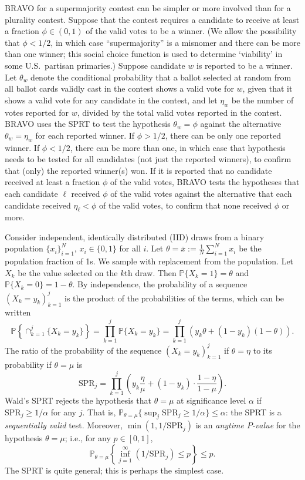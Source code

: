 \documentclass[aoas]{imsart}
\newcommand{\SPR}{\ensuremath{\mathrm{SPR}}}
\renewcommand{\Pr}{\mathbb{P}}
\begin{document}
BRAVO for a supermajority contest can be simpler or more involved than for a plurality contest. 
Suppose that the contest requires a candidate to receive at least a fraction $\phi \in (0, 1)$ of the valid votes
to be a winner.
(We allow the possibility that $\phi < 1/2$, in which case ``supermajority'' is a misnomer and there can be more than one winner;
this social choice function is used to determine `viability' in some U.S.\ partisan primaries.)
Suppose candidate $w$ is reported to be a winner.
Let $\theta_w$ denote the conditional probability that a ballot selected
at random from all ballot cards validly cast in the contest shows a valid vote for $w$, given that it shows a valid 
vote for any candidate in the contest,
and let $\eta_w$ be the number of votes reported for $w$, divided by the total valid votes reported in the contest.
BRAVO uses the SPRT to test the hypothesis $\theta_w = \phi$ against the alternative $\theta_w = \eta_w$
for each reported winner. 
If $\phi > 1/2$, there can be only one reported winner. 
If $\phi < 1/2$, there can be more than one, in which case
that hypothesis needs to be tested for all candidates (not just the reported winners), to confirm that (only) the
reported winner(s) won.
If it is reported that no candidate received at least a fraction $\phi$ of the valid votes,  
BRAVO tests the hypotheses that each candidate $\ell$  received $\phi$ of the valid votes
against the alternative that each candidate received $\eta_\ell < \phi$ of the valid votes,
to confirm that none received $\phi$ or more.

Consider independent, identically distributed (IID) draws from a binary population $\{x_i\}_{i=1}^N$, 
$x_i \in \{0, 1\}$ for all $i$.
Let $\theta = \bar{x} := \frac{1}{N} \sum_{i=1}^N x_i$ be the population fraction of 1s.
We sample with replacement from the population.
Let $X_k$ be the value selected on the $k$th draw. 
Then $\Pr \{X_k = 1 \} = \theta$ and $\Pr \{X_k = 0 \} = 1-\theta$.
By independence, the probability of a sequence $(X_k=y_k)_{k=1}^j$ is the product of the probabilities of the terms,
which can be written 
\begin{equation}
\Pr \left \{ \cap_{k=1}^j \{X_k = y_k \} \right \}= \prod_{k=1}^j \Pr \{X_k = y_k\} = \prod_{k=1}^j \left ( y_k \theta + (1-y_k)(1-\theta) \right ).
\end{equation}
The ratio of the probability of the sequence $(X_k=y_k)_{k=1}^j$ if $\theta = \eta$ to its probability if $\theta = \mu$ is
\begin{equation}
  \SPR_j = \prod_{k=1}^j \left ( y_k \frac{\eta}{\mu} + (1-y_k) \cdot \frac{1-\eta}{1-\mu} \right ).
\end{equation}
Wald's SPRT rejects the hypothesis that $\theta = \mu$ at significance level $\alpha$ if
$\SPR_j \ge 1/\alpha$ for any $j$.
That is, $\Pr_{\theta = \mu} \{\sup_j \SPR_j \ge 1/\alpha \} \le \alpha$: the SPRT is a \emph{sequentially valid} test.
Moreover, $\min(1, 1/\SPR_j)$ is an \emph{anytime $P$-value} for the hypothesis $\theta = \mu$; i.e.,
for any $p \in [0, 1]$, 
$$\Pr_{\theta = \mu}  \left \{\inf_{j=1}^\infty (1/\SPR_j) \le p \right \} \le p.$$
The SPRT is quite general; this is perhaps the simplest case.
\end{document}
